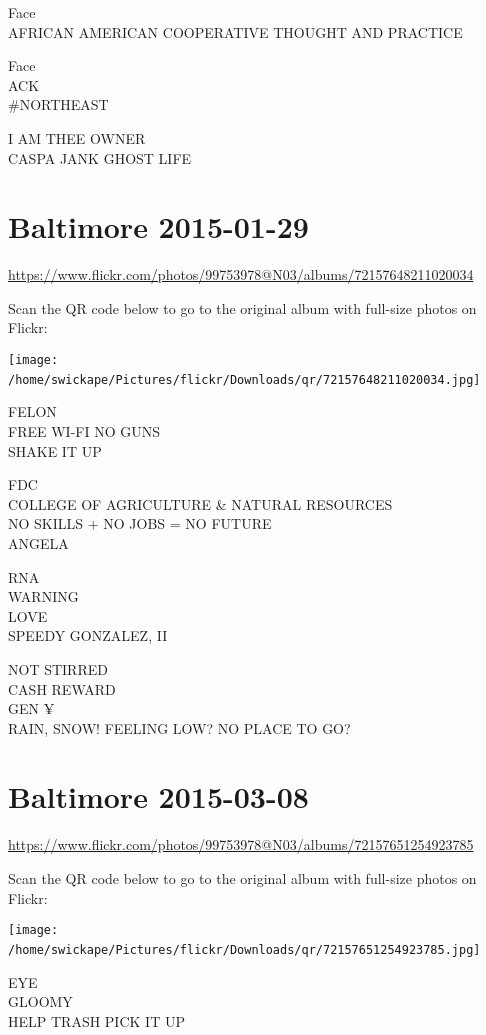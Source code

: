 \documentclass[10pt,letterpaper]{article}
\begin{document}
Face\\
AFRICAN AMERICAN COOPERATIVE THOUGHT AND PRACTICE

Face\\
ACK\\
\#NORTHEAST

I AM THEE OWNER\\
CASPA JANK GHOST LIFE
\

\section*{Baltimore 2015-01-29}

\url{https://www.flickr.com/photos/99753978@N03/albums/72157648211020034}

Scan the QR code below to go to the original album with full-size photos on Flickr:

\texttt{[image: /home/swickape/Pictures/flickr/Downloads/qr/72157648211020034.jpg]}
\

FELON\\
FREE WI{-}FI NO GUNS\\
SHAKE IT UP

FDC\\
COLLEGE OF AGRICULTURE \& NATURAL RESOURCES\\
NO SKILLS + NO JOBS = NO FUTURE\\
ANGELA

RNA\\
WARNING\\
LOVE\\
SPEEDY GONZALEZ, II

NOT STIRRED\\
CASH REWARD\\
GEN ¥\\
RAIN, SNOW!  FEELING LOW?  NO PLACE TO GO?
\

\section*{Baltimore 2015-03-08}

\url{https://www.flickr.com/photos/99753978@N03/albums/72157651254923785}

Scan the QR code below to go to the original album with full-size photos on Flickr:

\texttt{[image: /home/swickape/Pictures/flickr/Downloads/qr/72157651254923785.jpg]}
\

EYE\\
GLOOMY\\
HELP TRASH PICK IT UP
\end{document}
